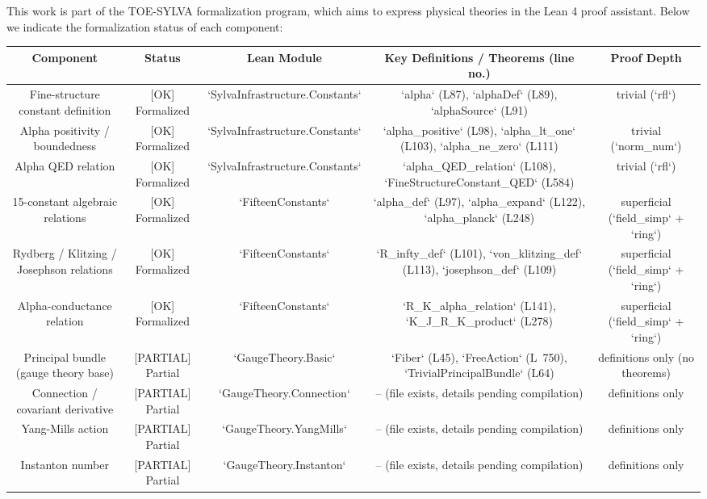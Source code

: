 \documentclass[11pt,a4paper]{article}
\theoremstyle{plain}
\theoremstyle{definition}
\begin{document}
This work is part of the TOE-SYLVA formalization program, which aims to express physical theories in the Lean 4 proof assistant. Below we indicate the formalization status of each component:

\begin{table}[h]
\centering
\begin{tabular}{|c|c|c|c|c|}
\hline
Component & Status & Lean Module & Key Definitions / Theorems (line no.) & Proof Depth \\ \hline
Fine-structure constant definition & [OK] Formalized & `SylvaInfrastructure.Constants` & `alpha` (L87), `alphaDef` (L89), `alphaSource` (L91) & trivial (`rfl`) \\ \hline
Alpha positivity / boundedness & [OK] Formalized & `SylvaInfrastructure.Constants` & `alpha_positive` (L98), `alpha_lt_one` (L103), `alpha_ne_zero` (L111) & trivial (`norm_num`) \\ \hline
Alpha QED relation & [OK] Formalized & `SylvaInfrastructure.Constants` & `alpha_QED_relation` (L108), `FineStructureConstant_QED` (L584) & trivial (`rfl`) \\ \hline
15-constant algebraic relations & [OK] Formalized & `FifteenConstants` & `alpha_def` (L97), `alpha_expand` (L122), `alpha_planck` (L248) & superficial (`field_simp` + `ring`) \\ \hline
Rydberg / Klitzing / Josephson relations & [OK] Formalized & `FifteenConstants` & `R_infty_def` (L101), `von_klitzing_def` (L113), `josephson_def` (L109) & superficial (`field_simp` + `ring`) \\ \hline
Alpha-conductance relation & [OK] Formalized & `FifteenConstants` & `R_K_alpha_relation` (L141), `K_J_R_K_product` (L278) & superficial (`field_simp` + `ring`) \\ \hline
Principal bundle (gauge theory base) & [PARTIAL] Partial & `GaugeTheory.Basic` & `Fiber` (L45), `FreeAction` (L~750), `TrivialPrincipalBundle` (L64) & definitions only (no theorems) \\ \hline
Connection / covariant derivative & [PARTIAL] Partial & `GaugeTheory.Connection` & -- (file exists, details pending compilation) & definitions only \\ \hline
Yang-Mills action & [PARTIAL] Partial & `GaugeTheory.YangMills` & -- (file exists, details pending compilation) & definitions only \\ \hline
Instanton number & [PARTIAL] Partial & `GaugeTheory.Instanton` & -- (file exists, details pending compilation) & definitions only \\ \hline

\end{tabular}
\end{table}
\end{document}
